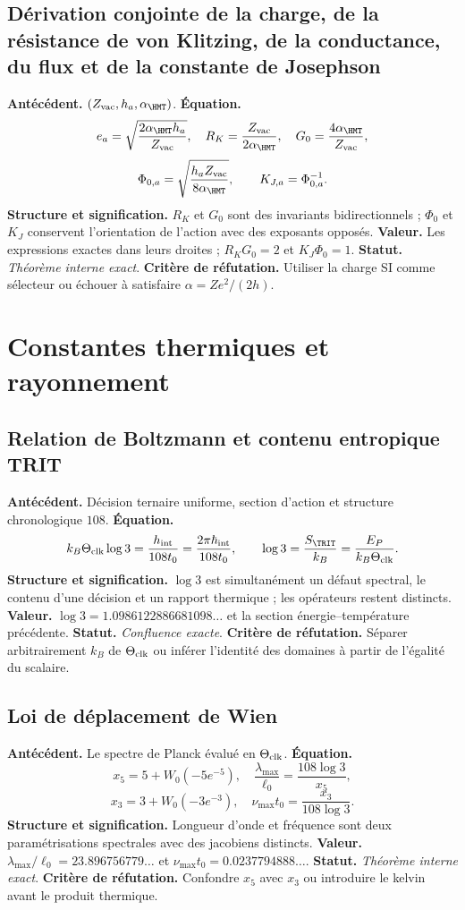\subsection*{Dérivation conjointe de la charge, de la résistance de von Klitzing, de la conductance, du flux et de la constante de Josephson}
\textbf{Antécédent.} \((Z_{\rm vac},h_a,\alpha_{\HMT})\).
\textbf{Équation.}
\[
e_a=\sqrt{\frac{2\alpha_{\HMT}h_a}{Z_{\rm vac}}},\quad
R_K=\frac{Z_{\rm vac}}{2\alpha_{\HMT}},\quad
G_0=\frac{4\alpha_{\HMT}}{Z_{\rm vac}},
\]
\[
\Phi_{0,a}=\sqrt{\frac{h_aZ_{\rm vac}}{8\alpha_{\HMT}}},
\qquad K_{J,a}=\Phi_{0,a}^{-1}.
\]
\textbf{Structure et signification.} \(R_K\) et \(G_0\) sont des invariants
bidirectionnels ; \(\Phi_0\) et \(K_J\) conservent l'orientation de l'action avec des
exposants opposés. \textbf{Valeur.} Les expressions exactes dans leurs droites ;
\(R_KG_0=2\) et \(K_J\Phi_0=1\). \textbf{Statut.}
\emph{Théorème interne exact}. \textbf{Critère de réfutation.} Utiliser la charge SI comme sélecteur ou
échouer à satisfaire \(\alpha=Ze^2/(2h)\).

\section{Constantes thermiques et rayonnement}

\subsection*{Relation de Boltzmann et contenu entropique TRIT }
\textbf{Antécédent.} Décision ternaire uniforme, section d'action et
structure chronologique \(108\). \textbf{Équation.}
\[
k_B\Theta_{\rm clk}\log3=\frac{h_{\rm int}}{108t_0}
=\frac{2\pi\hbar_{\rm int}}{108t_0},
\qquad
\log3=\frac{S_{\TRIT}}{k_B}=\frac{E_P}{k_B\Theta_{\rm clk}}.
\]
\textbf{Structure et signification.} \(\log3\) est simultanément un défaut
spectral, le contenu d'une décision et un rapport thermique ; les opérateurs
restent
distincts. \textbf{Valeur.} \(\log3=1.0986122886681098\ldots\) et la section
énergie--température précédente. \textbf{Statut.} \emph{Confluence
exacte}. \textbf{Critère de réfutation.} Séparer arbitrairement \(k_B\) de
\(\Theta_{\rm clk}\) ou inférer l'identité des domaines à partir de l'égalité du scalaire.

\subsection*{Loi de déplacement de Wien }
\textbf{Antécédent.} Le spectre de Planck évalué en
\(\Theta_{\rm clk}\). \textbf{Équation.}
\[
x_5=5+W_0(-5e^{-5}),\quad
\frac{\lambda_{\max}}{\ell_0}=\frac{108\log3}{x_5},
\]
\[
x_3=3+W_0(-3e^{-3}),\quad
\nu_{\max}t_0=\frac{x_3}{108\log3}.
\]
\textbf{Structure et signification.} Longueur d'onde et fréquence sont deux
paramétrisations spectrales avec des jacobiens distincts. \textbf{Valeur.}
\(\lambda_{\max}/\ell_0=23.896756779\ldots\) et
\(\nu_{\max}t_0=0.0237794888\ldots\). \textbf{Statut.}
\emph{Théorème interne exact}. \textbf{Critère de réfutation.} Confondre \(x_5\) avec \(x_3\) ou
introduire le kelvin avant le produit thermique.

